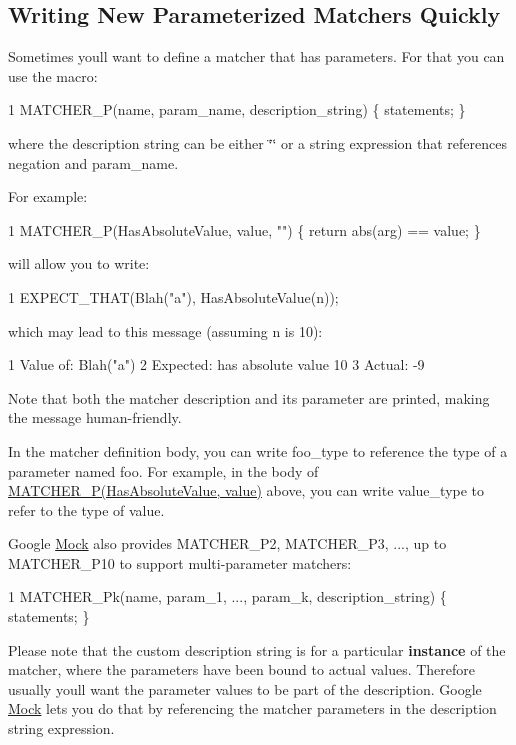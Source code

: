 \subsection*{Writing New Parameterized Matchers Quickly}

Sometimes you\textquotesingle{}ll want to define a matcher that has parameters. For that you can use the macro\+: 
\begin{DoxyCode}
1 MATCHER\_P(name, param\_name, description\_string) \{ statements; \}
\end{DoxyCode}
 where the description string can be either {\ttfamily \char`\"{}\char`\"{}} or a string expression that references {\ttfamily negation} and {\ttfamily param\+\_\+name}.

For example\+: 
\begin{DoxyCode}
1 MATCHER\_P(HasAbsoluteValue, value, "") \{ return abs(arg) == value; \}
\end{DoxyCode}
 will allow you to write\+: 
\begin{DoxyCode}
1 EXPECT\_THAT(Blah("a"), HasAbsoluteValue(n));
\end{DoxyCode}
 which may lead to this message (assuming {\ttfamily n} is 10)\+: 
\begin{DoxyCode}
1 Value of: Blah("a")
2 Expected: has absolute value 10
3   Actual: -9
\end{DoxyCode}


Note that both the matcher description and its parameter are printed, making the message human-\/friendly.

In the matcher definition body, you can write {\ttfamily foo\+\_\+type} to reference the type of a parameter named {\ttfamily foo}. For example, in the body of {\ttfamily \hyperlink{gmock-generated-matchers_8h_acb7ae915efa2fd8d3f6ea7313198afb6}{M\+A\+T\+C\+H\+E\+R\+\_\+\+P(\+Has\+Absolute\+Value, value)}} above, you can write {\ttfamily value\+\_\+type} to refer to the type of {\ttfamily value}.

Google \hyperlink{class_mock}{Mock} also provides {\ttfamily M\+A\+T\+C\+H\+E\+R\+\_\+\+P2}, {\ttfamily M\+A\+T\+C\+H\+E\+R\+\_\+\+P3}, ..., up to {\ttfamily M\+A\+T\+C\+H\+E\+R\+\_\+\+P10} to support multi-\/parameter matchers\+: 
\begin{DoxyCode}
1 MATCHER\_Pk(name, param\_1, ..., param\_k, description\_string) \{ statements; \}
\end{DoxyCode}


Please note that the custom description string is for a particular {\bfseries instance} of the matcher, where the parameters have been bound to actual values. Therefore usually you\textquotesingle{}ll want the parameter values to be part of the description. Google \hyperlink{class_mock}{Mock} lets you do that by referencing the matcher parameters in the description string expression.

